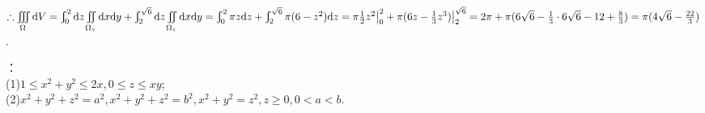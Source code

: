 \documentclass[12pt,UTF8]{ctexart}
\newcommand{\Int}[4]{\varint\nolimits_{#1}^{#2}#3\mathrm d#4}
\newcommand{\varIInt}[4]{\iint\limits_{#1}#2\mathrm d#3\mathrm d#4}
\newcommand{\IIInt}[3]{\iiint\limits_{#1}#2\mathrm d#3}
\begin{document}
\begin{enumerate}
$\therefore\IIInt\Omega{}V=\Int02{}z\varIInt{\Omega_z}{}xy+\Int2{\sqrt6}{}z\varIInt{\Omega_z}{}xy=\Int02{\pi z}z+\Int2{\sqrt6}{\pi(6-z^2)}z\\
=\pi\frac12z^2\big|_0^2+\pi(6z-\frac13z^3)\big|_2^{\sqrt6}=2\pi+\pi(6\sqrt6-\frac13\cdot6\sqrt6-12+\frac83)=\pi(4\sqrt6-\frac{22}3)$.
%

：\\
(1)$1\leqslant x^2+y^2\leqslant2x,0\leqslant z\leqslant xy$;\\
(2)$x^2+y^2+z^2=a^2,x^2+y^2+z^2=b^2,x^2+y^2=z^2,z\geqslant0,0<a<b$.


\end{enumerate}
\end{document}
